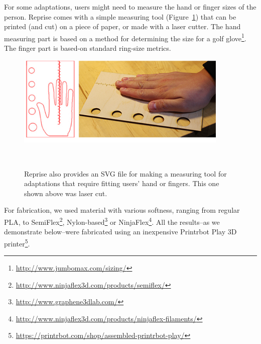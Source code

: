 For some adaptations, users might need to measure the hand or finger sizes of the person. Reprise comes with a simple measuring tool (Figure~\ref{fig:reprise_hand_measuring}) that can be printed (and cut) on a piece of paper, or made with a laser cutter. The hand measuring part is based on a method for determining the size for a golf glove\footnote{\url{http://www.jumbomax.com/sizing/}}. The finger part is based-on standard ring-size metrics.

\begin{figure}[h!]
\vskip 7pt
  \centering
  \includegraphics[width=0.9\textwidth]{figures/reprise_hand_measuring_v1.pdf}
\caption{Reprise also provides an SVG file for making a measuring tool for adaptations that require fitting users' hand or fingers. This one shown above was laser cut.}~\label{fig:reprise_hand_measuring}
\end{figure}

For fabrication, we used material with various softness, ranging from regular PLA, to SemiFlex\footnote{\url{http://www.ninjaflex3d.com/products/semiflex/}}, Nylon-based\footnote{\url{http://www.graphene3dlab.com/}} or NinjaFlex\footnote{\url{http://www.ninjaflex3d.com/products/ninjaflex-filaments/}}. All the results--as we demonstrate below--were fabricated using an inexpensive Printrbot Play 3D printer\footnote{\url{https://printrbot.com/shop/assembled-printrbot-play/}}.


